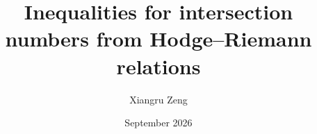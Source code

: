 \title[Inequalities from Hodge--Riemann relations]{Inequalities for intersection numbers from Hodge--Riemann relations}
\author{Xiangru Zeng}
\date{September 2026}
